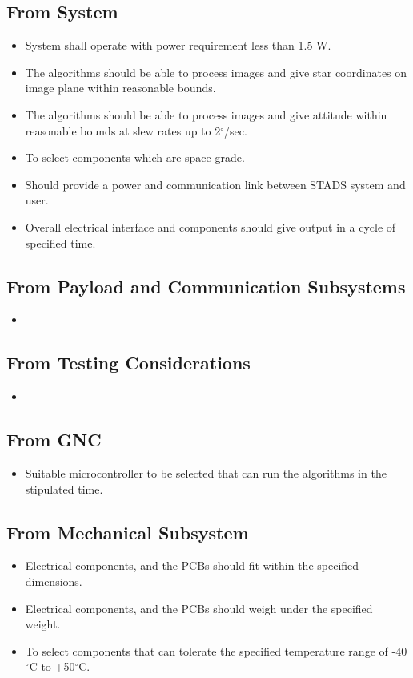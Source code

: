 \subsection{From System}
\begin{itemize}
    \item System shall operate with power requirement less than 1.5 W.
    \item The algorithms should be able to process images and give star coordinates on image plane within reasonable bounds.
    \item The algorithms should be able to process images and give attitude within reasonable bounds at slew rates up to 2$^\circ$/sec.
    \item To select components which are space-grade.
    \item Should provide a power and communication link between STADS system and user.
    \item Overall electrical interface and components should give output in a cycle of specified time.
    
\end{itemize}
\subsection{From Payload and Communication Subsystems}
\begin{itemize}
    \item 
\end{itemize}
\subsection{From Testing Considerations}
\begin{itemize}
    \item 
\end{itemize}
\subsection{From GNC}
\begin{itemize}
    \item Suitable microcontroller to be selected that can run the algorithms in the stipulated time.
    
\end{itemize}
\subsection{From Mechanical Subsystem}
\begin{itemize}
    \item Electrical components, and the PCBs should fit within the specified dimensions.
    \item Electrical components, and the PCBs should weigh under the specified weight.
    \item To select components that can tolerate the specified temperature range of -40$^\circ$C to +50$^\circ$C.
\end{itemize}


